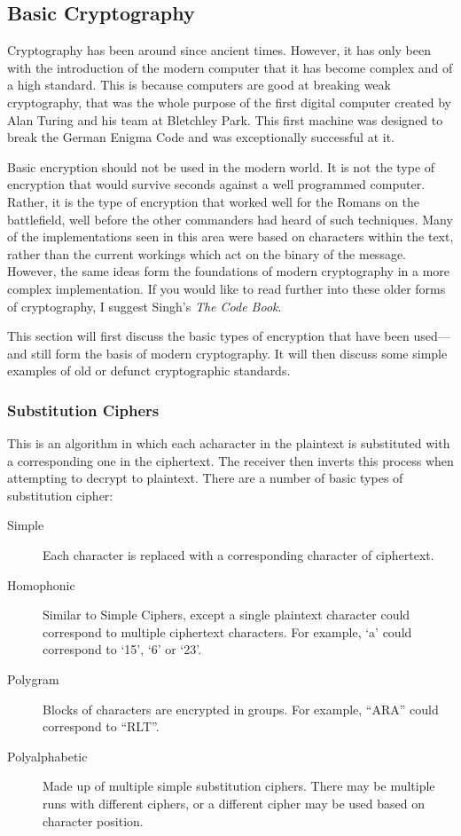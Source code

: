 		\subsection{Basic Cryptography}
			Cryptography has been around since ancient times. 
			However, it has only been with the introduction of the modern computer that it has become complex and of a high standard. 
			This is because computers are good at breaking weak cryptography, that was the whole purpose of the first digital computer created by Alan Turing and his team at Bletchley Park. 
			This first machine was designed to break the German Enigma Code and was exceptionally successful at it. 

			Basic encryption should not be used in the modern world. 
			It is not the type of encryption that would survive seconds against a well programmed computer. 
			Rather, it is the type of encryption that worked well for the Romans on the battlefield, well before the other commanders had heard of such techniques. 
			Many of the implementations seen in this area were based on characters within the text, 
			rather than the current workings which act on the binary of the message. 
			However, the same ideas form the foundations of modern cryptography in a more complex implementation. 
			If you would like to read further into these older forms of cryptography, I suggest Singh's \textit{The Code Book}\cite{CodeBook}.
			
			This section will first discuss the basic types of encryption that have been used---and still form the basis of modern cryptography. 
			It will then discuss some simple examples of old or defunct cryptographic standards.

			\subsubsection{Substitution Ciphers}
				This is an algorithm in which each acharacter in the plaintext is substituted with a corresponding one in the ciphertext. 
				The receiver then inverts this process when attempting to decrypt to plaintext. 
				There are a number of basic types of substitution cipher:
				\begin{description}
					\item[Simple] Each character is replaced with a corresponding character of ciphertext. 
					\item[Homophonic] Similar to Simple Ciphers, except a single plaintext character could correspond to multiple ciphertext characters. 
						For example, `a' could correspond to `15', `6' or `23'. 
					\item[Polygram] Blocks of characters are encrypted in groups. 
						For example, ``ARA'' could correspond to ``RLT''. 
					\item[Polyalphabetic] Made up of multiple simple substitution ciphers. 
						There may be multiple runs with different ciphers, or a different cipher may be used based on character position. 
				\end{description}

